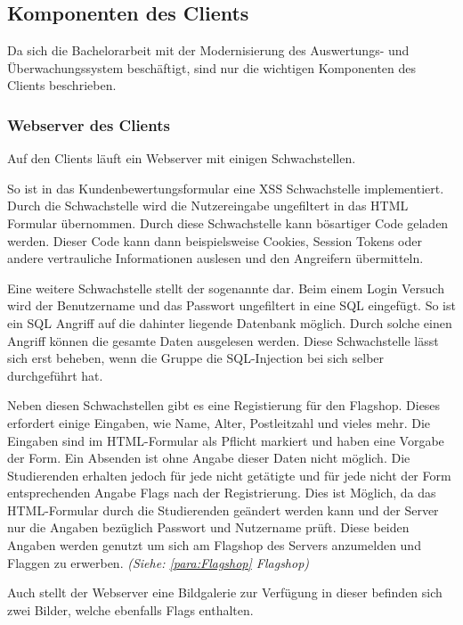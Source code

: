 \subsection{Komponenten des Clients}\label{subsec:Komponente_des_Clients}
Da sich die Bachelorarbeit mit der Modernisierung des Auswertungs- und Überwachungssystem beschäftigt, sind nur die wichtigen Komponenten des Clients beschrieben.

\subsubsection{Webserver des Clients}\label{subsubsec:Webserver_des_Clients}
Auf den Clients läuft ein Webserver mit einigen Schwachstellen. 

So ist in das Kundenbewertungsformular eine XSS Schwachstelle implementiert. Durch die Schwachstelle wird die Nutzereingabe ungefiltert in das HTML Formular übernommen. Durch diese Schwachstelle kann bösartiger Code geladen werden. Dieser Code kann dann beispielsweise Cookies, Session Tokens oder andere vertrauliche Informationen auslesen und den Angreifern übermitteln. 

Eine weitere Schwachstelle stellt der sogenannte  dar. Beim einem Login Versuch wird der Benutzername und das Passwort ungefiltert in eine SQL eingefügt. So ist ein SQL Angriff auf die dahinter liegende Datenbank möglich. Durch solche einen Angriff können die gesamte Daten ausgelesen werden. Diese Schwachstelle lässt sich erst beheben, wenn die Gruppe die SQL-Injection bei sich selber durchgeführt hat.

Neben diesen Schwachstellen gibt es eine Registierung für den Flagshop. Dieses erfordert einige Eingaben, wie Name, Alter, Postleitzahl und vieles mehr. Die Eingaben sind im HTML-Formular als Pflicht markiert und haben eine Vorgabe der Form. Ein Absenden ist ohne Angabe dieser Daten nicht möglich. Die Studierenden erhalten jedoch für jede nicht getätigte und für jede nicht der Form entsprechenden Angabe Flags nach der Registrierung. Dies ist Möglich, da das HTML-Formular durch die Studierenden geändert werden kann und der Server nur die Angaben bezüglich Passwort und Nutzername prüft. Diese beiden Angaben werden genutzt um sich am Flagshop des Servers anzumelden und Flaggen zu erwerben. \textit{(Siehe: \ref{para:Flagshop} Flagshop)}

Auch stellt der Webserver eine Bildgalerie zur Verfügung in dieser befinden sich zwei Bilder, welche ebenfalls Flags enthalten.